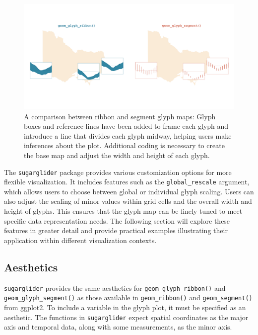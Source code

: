 \begin{figure}

{\centering \includegraphics[width=1\linewidth]{figures/ribbon_segment} 

}

\caption{A comparison between ribbon and segment glyph maps: Glyph boxes and reference lines have been added to frame each glyph and introduce a line that divides each glyph midway, helping users make inferences about the plot. Additional coding is necessary to create the base map and adjust the width and height of each glyph.}\label{fig:comparisonPlot}
\end{figure}

The \texttt{sugarglider} package provides various customization options for more flexible visualization. It includes features such as the \texttt{global\_rescale} argument, which allows users to choose between global or individual glyph scaling. Users can also adjust the scaling of minor values within grid cells and the overall width and height of glyphs. This ensures that the glyph map can be finely tuned to meet specific data representation needs. The following section will explore these features in greater detail and provide practical examples illustrating their application within different visualization contexts.

\hypertarget{aesthetics}{%
\subsection{Aesthetics}\label{aesthetics}}

\texttt{sugarglider} provides the same aesthetics for \texttt{geom\_glyph\_ribbon()} and \texttt{geom\_glyph\_segment()} as those available in \texttt{geom\_ribbon()} and \texttt{geom\_segment()} from ggplot2. To include a variable in the glyph plot, it must be specified as an aesthetic. The functions in \texttt{sugarglider} expect spatial coordinates as the major axis and temporal data, along with some measurements, as the minor axis.

